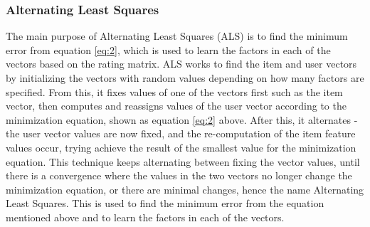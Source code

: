 

\subsubsection{Alternating Least Squares} \label{als}

The main purpose of Alternating Least Squares (ALS) is to find the minimum error from equation \ref{eq:2}, which is used to learn the factors in each of the vectors based on the rating matrix. ALS works to find the item and user vectors by initializing the vectors with random values depending on how many factors are specified. From this, it fixes values of one of the vectors first such as the item vector, then computes and reassigns values of the user vector according to the minimization equation, shown as equation \ref{eq:2} above. After this, it alternates - the user vector values are now fixed, and the re-computation of the item feature values occur, trying achieve the result of the smallest value for the minimization equation. This technique keeps alternating between fixing the vector values, until there is a convergence where the values in the two vectors no longer change the minimization equation, or there are minimal changes, hence the name Alternating Least Squares. This is used to find the minimum error from the equation mentioned above and to learn the factors in each of the vectors. 


